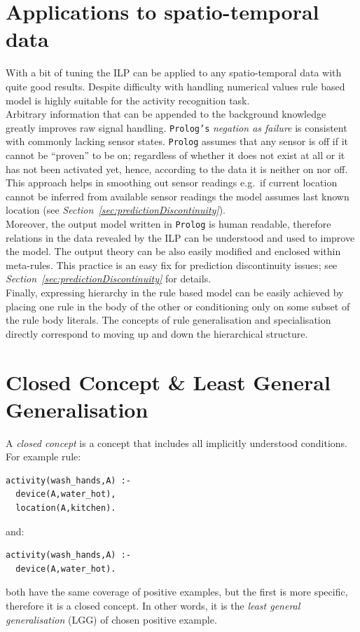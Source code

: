 \documentclass[10pt, a4paper, pdflatex, leqno, twoside, openright]{report}
\begin{document}
  \section{Applications to spatio-temporal data}
With a bit of tuning the ILP can be applied to any spatio-temporal data with quite good results. Despite difficulty with handling numerical values rule based model is highly suitable for the activity recognition task.\\

Arbitrary information that can be appended to the background knowledge greatly improves raw signal handling. \texttt{Prolog's} \emph{negation as failure} is consistent with commonly lacking sensor states. \texttt{Prolog} assumes that any sensor is off if it cannot be ``proven'' to be on; regardless of whether it does not exist at all or it has not been activated yet, hence, according to the data it is neither on nor off. This approach helps in smoothing out sensor readings e.g.\ if current location cannot be inferred from available sensor readings the model assumes last known location (see \emph{Section~\ref{sec:predictionDiscontinuity}}).\\

Moreover, the output model written in \texttt{Prolog} is human readable, therefore relations in the data revealed by the ILP can be understood and used to improve the model. The output theory can be also easily modified and enclosed within meta-rules. This practice is an easy fix for prediction discontinuity issues; see \emph{Section~\ref{sec:predictionDiscontinuity}} for details.\\

Finally, expressing hierarchy in the rule based model can be easily achieved by placing one rule in the body of the other or conditioning only on some subset of the rule body literals. The concepts of rule generalisation and specialisation directly correspond to moving up and down the hierarchical structure.

  \section{Closed Concept \& Least General Generalisation\label{sec:closedConcept}}
A \emph{closed concept} is a concept that includes all implicitly understood conditions. For example rule:\\
\begin{verbatim}
activity(wash_hands,A) :-
  device(A,water_hot),
  location(A,kitchen).
\end{verbatim}
and:\\
\begin{verbatim}
activity(wash_hands,A) :-
  device(A,water_hot).
\end{verbatim}
both have the same coverage of positive examples, but the first is more specific, therefore it is a closed concept. In other words, it is the \emph{least general generalisation} (LGG) of chosen positive example.\\
\end{document}

